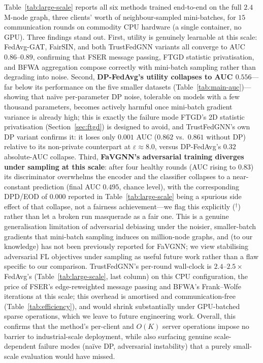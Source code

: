\documentclass[pdflatex,sn-mathphys-num]{sn-jnl}
\makeatletter
\theoremstyle{thmstyleone}%
\theoremstyle{thmstyletwo}%
\theoremstyle{thmstylethree}%
\providecommand{\DIFadd}[1]{{\protect\color{blue}\uwave{#1}}} %
\providecommand{\DIFdel}[1]{{\protect\color{red}\sout{#1}}} %
\providecommand{\DIFaddbegin}{} %
\providecommand{\DIFaddend}{} %
\providecommand{\DIFdelbegin}{} %
\providecommand{\DIFdelend}{} %
\providecommand{\DIFscaledelfig}{0.5}
\newlength{\DIFdelgraphicswidth} %
\newlength{\DIFdelgraphicsheight} %
\providecommand{\DIFaddincludegraphics}[2][]{{\color{blue}\fbox{\DIFOincludegraphics[#1]{#2}}}} %
\providecommand{\DIFdelincludegraphics}[2][]{%
\sbox{\DIFdelgraphicsbox}{\DIFOincludegraphics[#1]{#2}}%
\settoboxwidth{\DIFdelgraphicswidth}{\DIFdelgraphicsbox} %
\settoboxtotalheight{\DIFdelgraphicsheight}{\DIFdelgraphicsbox} %
\scalebox{\DIFscaledelfig}{%
\parbox[b]{\DIFdelgraphicswidth}{\usebox{\DIFdelgraphicsbox}\\[-\baselineskip] \rule{\DIFdelgraphicswidth}{0em}}\llap{\resizebox{\DIFdelgraphicswidth}{\DIFdelgraphicsheight}{%
\setlength{\unitlength}{\DIFdelgraphicswidth}%
\begin{picture}(1,1)%
\thicklines\linethickness{2pt} %
{\color[rgb]{1,0,0}\put(0,0){\framebox(1,1){}}}%
{\color[rgb]{1,0,0}\put(0,0){\line( 1,1){1}}}%
{\color[rgb]{1,0,0}\put(0,1){\line(1,-1){1}}}%
\end{picture}%
}\hspace*{3pt}}} %
} %
\DeclareRobustCommand{\DIFaddbegin}{\DIFOaddbegin \let\includegraphics\DIFaddincludegraphics} %
\DeclareRobustCommand{\DIFaddend}{\DIFOaddend \let\includegraphics\DIFOincludegraphics} %
\DeclareRobustCommand{\DIFdelbegin}{\DIFOdelbegin \let\includegraphics\DIFdelincludegraphics} %
\DeclareRobustCommand{\DIFdelend}{\DIFOaddend \let\includegraphics\DIFOincludegraphics} %
\let\sout@orig\sout %
\renewcommand{\sout}[1]{\ifmmode\text{\sout@orig{\ensuremath{#1}}}\else\sout@orig{#1}\fi} %
\makeatother
\begin{document}
Table~\ref{tab:large-scale} reports all six methods trained end-to-end on the
full $2.4$M-node graph, three clients' worth of neighbour-sampled mini-batches,
for $15$ communication rounds on commodity CPU hardware (a single
container, no GPU). Three findings stand out. First, utility is genuinely
learnable at this scale: FedAvg-GAT, FairSIN, and both TrustFedGNN variants all
converge to AUC $0.86$--$0.89$, confirming that FSER message passing, FTGD
statistic privatisation, and BFWA aggregation compose correctly with
mini-batch sampling rather than degrading into noise. Second,
\textbf{DP-FedAvg's utility collapses to AUC $0.556$}---far below its
performance on the five smaller datasets (Table~\ref{tab:main-auc})---showing
that naïve per-parameter DP noise, tolerable on models with a few thousand
parameters, becomes actively harmful once mini-batch gradient variance is
already high; this is exactly the failure mode FTGD's 2D statistic
privatisation (Section~\ref{sec:ftgd}) is designed to avoid, and TrustFedGNN's
own DP variant confirms it: it loses only $0.001$ AUC ($0.862$ vs.\ $0.861$
without DP) relative to its non-private counterpart at $\varepsilon\approx 8.0$,
versus DP-FedAvg's $0.32$ absolute-AUC collapse. Third,
\textbf{FaVGNN's adversarial training diverges under sampling at this scale}:
after four healthy rounds (AUC rising to $0.83$) its discriminator overwhelms
the encoder and the classifier collapses to a near-constant prediction (final
AUC $0.495$, chance level), with the corresponding DPD/EOD of $0.000$ reported
in Table~\ref{tab:large-scale} being a spurious side effect of that collapse,
not a fairness achievement---we flag this explicitly ($^{\dagger}$) rather
than let a broken run masquerade as a fair one. This is a genuine
generalisation limitation of adversarial debiasing under the noisier,
smaller-batch gradients that mini-batch sampling induces on million-node
graphs, and (to our knowledge) has not been previously reported for FaVGNN;
we view stabilising adversarial FL objectives under sampling as useful future
work rather than a flaw specific to our comparison. TrustFedGNN's per-round
wall-clock is \DIFdelbegin \DIFdel{$2.4$}\DIFdelend \DIFaddbegin \DIFadd{$2.45$}\DIFaddend --\DIFdelbegin \DIFdel{$2.5\times$ }\DIFdelend \DIFaddbegin \DIFadd{$2.53\times$ }\DIFaddend FedAvg's (Table~\ref{tab:large-scale},
last column) on this CPU configuration, the price of FSER's edge-reweighted
message passing and BFWA's Frank--Wolfe iterations at this scale; this
overhead is amortised and communication-free (Table~\ref{tab:efficiency}), and
would shrink substantially under GPU-batched sparse operations, which we
leave to future engineering work. Overall, this confirms that the method's
per-client and $O(K)$ server operations impose no barrier to industrial-scale
deployment, while also surfacing genuine scale-dependent failure modes
(naïve DP, adversarial instability) that a purely small-scale evaluation
would have missed.
\end{document}
